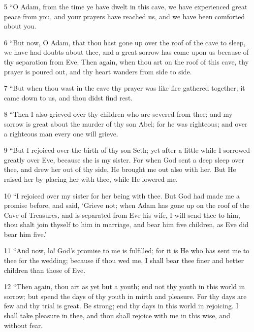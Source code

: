 \par 5 “O Adam, from the time ye have dwelt in this cave, we have experienced great peace from you, and your prayers have reached us, and we have been comforted about you.

\par 6 “But now, O Adam, that thou hast gone up over the roof of the cave to sleep, we have had doubts about thee, and a great sorrow has come upon us because of thy separation from Eve. Then again, when thou art on the roof of this cave, thy prayer is poured out, and thy heart wanders from side to side.

\par 7 “But when thou wast in the cave thy prayer was like fire gathered together; it came down to us, and thou didst find rest.

\par 8 “Then I also grieved over thy children who are severed from thee; and my sorrow is great about the murder of thy son Abel; for he was righteous; and over a righteous man every one will grieve.

\par 9 “But I rejoiced over the birth of thy son Seth; yet after a little while I sorrowed greatly over Eve, because she is my sister. For when God sent a deep sleep over thee, and drew her out of thy side, He brought me out also with her. But He raised her by placing her with thee, while He lowered me.

\par 10 “I rejoiced over my sister for her being with thee. But God had made me a promise before, and said, ‘Grieve not; when Adam has gone up on the roof of the Cave of Treasures, and is separated from Eve his wife, I will send thee to him, thou shalt join thyself to him in marriage, and bear him five children, as Eve did bear him five.’

\par 11 “And now, lo! God's promise to me is fulfilled; for it is He who has sent me to thee for the wedding; because if thou wed me, I shall bear thee finer and better children than those of Eve.

\par 12 “Then again, thou art as yet but a youth; end not thy youth in this world in sorrow; but spend the days of thy youth in mirth and pleasure. For thy days are few and thy trial is great. Be strong; end thy days in this world in rejoicing. I shall take pleasure in thee, and thou shall rejoice with me in this wise, and without fear.

